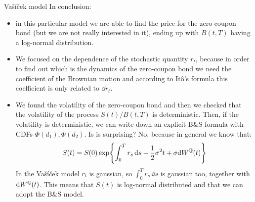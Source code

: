 \begin{example}{Vašíček model}{}{}
    In conclusion:
    \begin{itemize}
        \item in this particular model we are able to find the price for the zero-coupon bond (but we are not really interested in it), ending up with $B(t,T)$ having a log-normal distribution.
        \item We focused on the dependence of the stochastic quantity $r_t$, because in order to find out which is the dynamics of the zero-coupon bond we need the coefficient of the Brownian motion and according to Itô's formula this coefficient is only related to $\dd r_t$.
        \item We found the volatility of the zero-coupon bond and then we checked that the volatility of the process $S(t)/B(t,T)$ is deterministic. Then, if the volatility is deterministic, we can write down an explicit B\&S formula with CDFs $\Phi(d_1),\Phi(d_2)$. Is is surprising? No, because in general we know that:
        \begin{equation*}
            S(t) = S(0)\exp{\int_0^T r_s\,\dd s - \frac{1}{2}\sigma^2 t + \sigma\dd W^{\mathbb{Q}}(t)}
        \end{equation*}
        In the Vašíček model $r_t$ is gaussian, so $\int_0^T r_s\,\dd s$ is gaussian too, together with $\dd W^{\mathbb{Q}}(t)$. This means that $S(t)$ is log-normal distributed and that we can adopt the B\&S model.
    \end{itemize}
\end{example}
